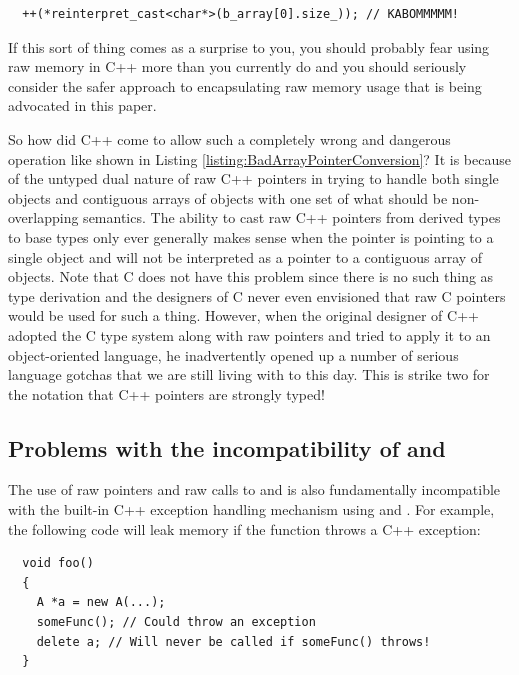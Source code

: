 \documentclass[pdf,ps2pdf,11pt]{SANDreport}
\begin{document}
{\small\begin{verbatim}
  ++(*reinterpret_cast<char*>(b_array[0].size_)); // KABOMMMMM!
\end{verbatim}}

If this sort of thing comes as a surprise to you, you should probably
fear using raw memory in C++ more than you currently do and you should
seriously consider the safer approach to encapsulating raw memory
usage that is being advocated in this paper.

So how did C++ come to allow such a completely wrong and dangerous
operation like shown in Listing
{}\ref{listing:BadArrayPointerConversion}?  It is because of the
untyped dual nature of raw C++ pointers in trying to handle both
single objects and contiguous arrays of objects with one set of what
should be non-overlapping semantics.  The ability to cast raw C++
pointers from derived types to base types only ever generally makes
sense when the pointer is pointing to a single object and will not be
interpreted as a pointer to a contiguous array of objects.  Note that
C does not have this problem since there is no such thing as type
derivation and the designers of C never even envisioned that raw C
pointers would be used for such a thing.  However, when the original
designer of C++ adopted the C type system along with raw pointers and
tried to apply it to an object-oriented language, he inadvertently
opened up a number of serious language gotchas that we are still
living with to this day.  This is strike two for the notation that C++
pointers are strongly typed!


%
{}\subsection{Problems with the incompatibility of
{} and {}}
%

The use of raw pointers and raw calls to {} and
{} is also fundamentally incompatible with the built-in
C++ exception handling mechanism using {} and
{}.  For example, the following code will leak memory
if the function {} throws a C++ exception:

{\small\begin{verbatim}
  void foo()
  {
    A *a = new A(...);
    someFunc(); // Could throw an exception
    delete a; // Will never be called if someFunc() throws!
  }
\end{verbatim}}
\end{document}
